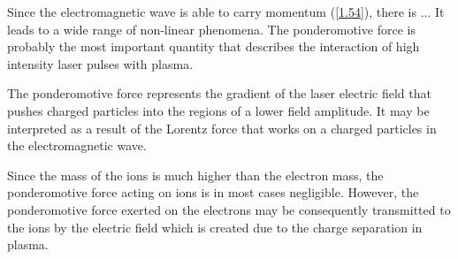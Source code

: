 Since the electromagnetic wave is able to carry momentum (\ref{1.54}), there is ... It leads to a wide range of non-linear phenomena. The ponderomotive force is probably the most important quantity that describes the interaction of high intensity laser pulses with plasma.

The ponderomotive force represents the gradient of the laser electric field that pushes charged particles into the regions of a lower field amplitude. It may be interpreted as a result of the Lorentz force that works on a charged particles in the electromagnetic wave.

Since the mass of the ions is much higher than the electron mass, the ponderomotive force acting on ions is in most cases negligible. However, the ponderomotive force exerted on the electrons may be consequently transmitted to the ions by the electric field which is created due to the charge separation in plasma.